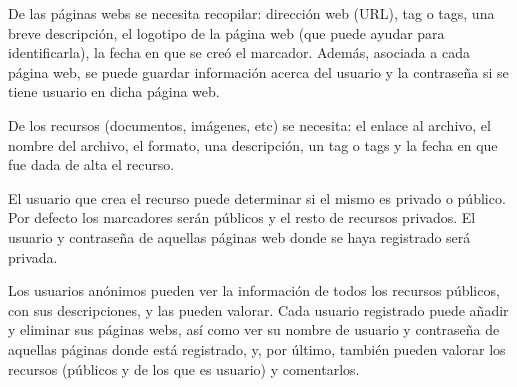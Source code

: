 \documentclass[12pt,twoside,a4paper]{article}
\begin{document}
De las páginas webs se necesita recopilar: dirección web (URL), tag o tags, una breve descripción, el logotipo de la página web (que puede ayudar para identificarla), la fecha en que se creó el marcador. Además, asociada a cada página web, se puede guardar información acerca del usuario y la contraseña si se tiene usuario en dicha página web.

De los recursos (documentos, imágenes, etc) se necesita: el enlace al archivo, el nombre del archivo, el formato, una descripción, un tag o tags y la fecha en que fue dada de alta el recurso.

El usuario que crea el recurso puede determinar si el mismo es privado o público. Por defecto los marcadores serán públicos y el resto de recursos privados. El usuario y contraseña de aquellas páginas web donde se haya registrado será privada.

Los usuarios anónimos pueden ver la información de todos los recursos públicos, con sus descripciones, y las pueden valorar. Cada usuario registrado puede añadir y eliminar sus páginas webs, así como ver su nombre de usuario y contraseña de aquellas páginas donde está registrado, y, por último, también pueden valorar los recursos (públicos y de los que es usuario) y comentarlos.
\end{document}
